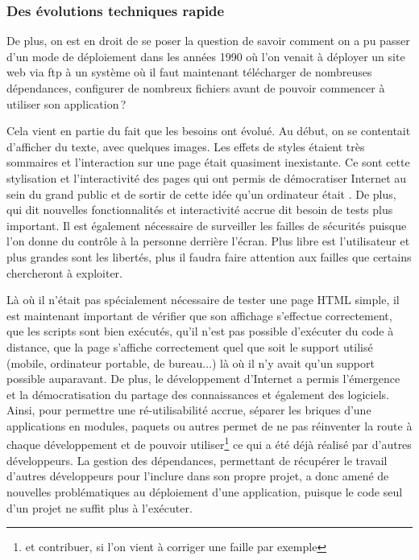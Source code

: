 \subsubsection{Des évolutions techniques rapide}

De plus, on est en droit de se poser la question de savoir comment on a pu passer d'un mode de déploiement dans les années 1990 où l'on venait à déployer un site web via \gls{ftp} à un système où il faut maintenant télécharger de nombreuses dépendances, configurer de nombreux fichiers avant de pouvoir commencer à utiliser son application ?

Cela vient en partie du fait que les besoins ont évolué. Au début, on se contentait d'afficher du texte, avec quelques images. Les effets de styles étaient très sommaires et l'interaction sur une page était quasiment inexistante. Ce sont cette stylisation et l'interactivité des pages qui ont permis de démocratiser Internet au sein du grand public et de sortir de cette idée qu'un ordinateur était . De plus, qui dit nouvelles fonctionnalités et interactivité accrue dit besoin de tests plus important. Il est également nécessaire de surveiller les failles de sécurités puisque l'on donne du contrôle à la personne derrière l'écran. Plus libre est l'utilisateur et plus grandes sont les libertés, plus il faudra faire attention aux failles que certains chercheront à exploiter.

Là où il n'était pas spécialement nécessaire de tester une page \gls{HTML} simple, il est maintenant important de vérifier que son affichage s'effectue correctement, que les scripts sont bien exécutés, qu'il n'est pas possible d'exécuter du code à distance, que la page s'affiche correctement quel que soit le support utilisé (mobile, ordinateur portable, de bureau...) là où il n'y avait qu'un support possible auparavant. De plus, le développement d'Internet a permis l'émergence et la démocratisation du partage des connaissances et également des logiciels. Ainsi, pour permettre une ré-utilisabilité accrue, séparer les briques d'une applications en modules, paquets ou autres permet de ne pas réinventer la route à chaque développement et de pouvoir utiliser\footnote{et contribuer, si l'on vient à corriger une faille par exemple} ce qui a été déjà réalisé par d'autres développeurs. La gestion des dépendances, permettant de récupérer le travail d'autres développeurs pour l'inclure dans son propre projet, a donc amené de nouvelles problématiques au déploiement d'une application, puisque le code seul d'un projet ne suffit plus à l'exécuter. 

